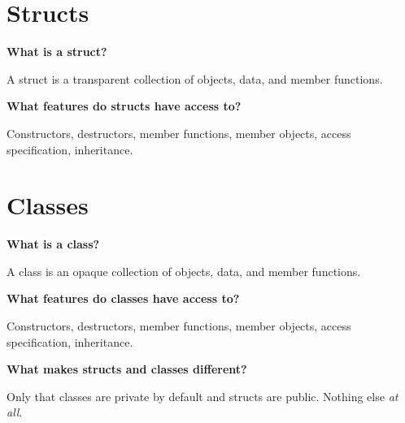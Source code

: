 \documentclass[12pt, letterpaper]{article}
\newcommand{\question}[1]{\textbf{#1}\par}
\newenvironment{answerblock}{\color{Green4}}{\normalcolor\vspace{1em}}
\begin{document}
\pagebreak
\section{Structs}

\question{What is a struct?}
\begin{answerblock}
A struct is a transparent collection of objects, data, and member functions.
\end{answerblock}

\question{What features do structs have access to?}
\begin{answerblock}
Constructors, destructors, member functions, member objects, access
specification, inheritance.
\end{answerblock}

\pagebreak
\section{Classes}

\question{What is a class?}
\begin{answerblock}
A class is an opaque collection of objects, data, and member functions.
\end{answerblock}

\question{What features do classes have access to?}
\begin{answerblock}
Constructors, destructors, member functions, member objects, access
specification, inheritance.
\end{answerblock}

\question{What makes structs and classes different?}
\begin{answerblock}
Only that classes are private by default and structs are public. Nothing else
\emph{at all}.
\end{answerblock}
\end{document}
